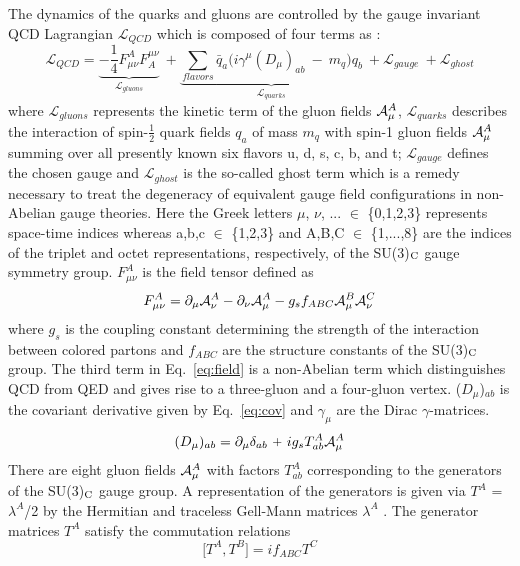 The dynamics of the quarks and gluons are controlled by the gauge invariant QCD Lagrangian $\mathcal{L}_{QCD}$ which is composed of four terms as : 
\begin{equation}
\mathcal{L}_{QCD} = \underbrace{-\frac{1}{4}F^A_{\mu\nu}F^{\mu\nu}_A}_\text{$\mathcal{L}_{gluons}$}~\plus \underbrace{\sum\limits_{flavors}^{} \bar{q}_a \big(i\gamma^\mu (D_\mu)_{ab}~-~m_q\big)q_b}_\text{$\mathcal{L}_{quarks}$}~\plus \mathcal{L}_{gauge}~\plus\mathcal{L}_{ghost}
\label{eq:lag}
\end{equation}
where $\mathcal{L}_{gluons}$ represents the kinetic term of the gluon fields ${\cal A}^A_\mu$, $\mathcal{L}_{quarks}$ describes the interaction of spin-$\frac{1}{2}$ quark fields $q_a$ of mass $m_q$ with spin-1 gluon fields ${\cal A}^A_\mu$ summing over all presently known six flavors u, d, s, c, b, and t; $\mathcal{L}_{gauge}$ defines the chosen gauge and $\mathcal{L}_{ghost}$ is the so-called ghost term which is a remedy necessary to treat the degeneracy of equivalent gauge field configurations in non-Abelian gauge theories. Here the Greek letters $\mu$, $\nu$, ... $\in$ \{0,1,2,3\} represents space-time indices whereas a,b,c $\in$ \{1,2,3\} and A,B,C $\in$ \{1,...,8\} are the indices of the triplet and octet representations, respectively, of the SU(3)$_{\rm C}$ gauge symmetry group. $F^A_{\mu\nu}$ is the field tensor defined as
\begin{equation}
F^A_{\mu\nu} = \partial_\mu {\cal A}^A_\nu - \partial_\nu {\cal A}^A_\mu - g_s f_{ABC}{\cal A}^B_\mu {\cal A}^C_\nu
\label{eq:field}
\end{equation}
where $g_s$ is the coupling constant determining the strength of the interaction between colored partons and $f_{ABC}$ are the structure constants of the SU(3)$_{\rm C}$ group. The third term in Eq.~\ref{eq:field} is a non-Abelian term which distinguishes QCD from QED and gives rise to a three-gluon and a four-gluon vertex. ($D_\mu$)$_{ab}$ is the covariant derivative given by Eq.~\ref{eq:cov} and $\gamma_\mu$ are the Dirac $\gamma$-matrices. 
\begin{equation}
(D_\mu)_{ab} = \partial_{\mu}\delta_{ab}~\plus ig_sT^A_{ab}{\cal A}^A_\mu
\label{eq:cov}
\end{equation}
There are eight gluon fields ${\cal A}^A_\mu$ with factors $T^A_{ab}$ corresponding to the generators of the SU(3)$_{\rm C}$ gauge group. A representation of the generators is given via $T^A$ = $\lambda^A$/2 by the Hermitian and traceless Gell-Mann matrices $\lambda^A$ \cite{GellMann:1962xb}. The generator matrices $T^A$ satisfy the commutation relations 
\begin{equation}
\bigg[T^A,T^B\bigg] = if_{ABC}T^C
\end{equation}

